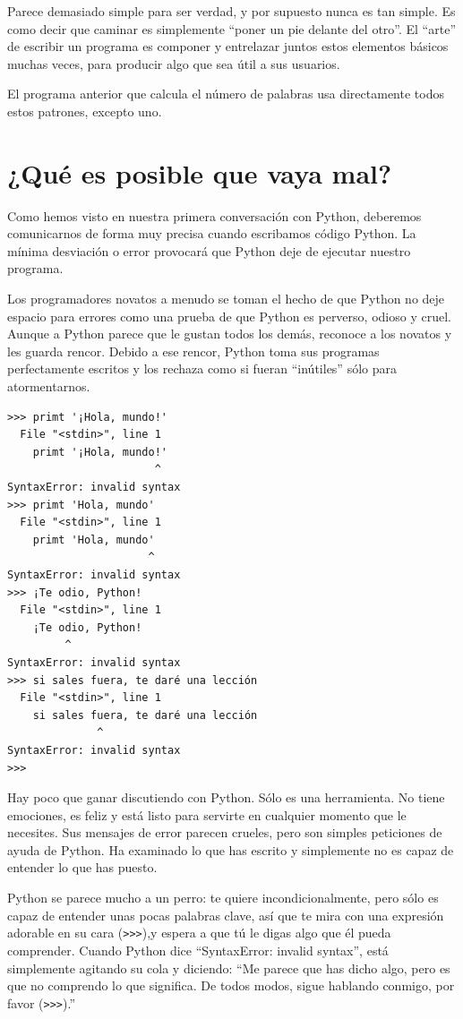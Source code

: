 Parece demasiado simple para ser verdad, y por supuesto nunca es tan simple.
Es como decir que caminar es simplemente
``poner un pie delante del otro''. El ``arte''
de escribir un programa es componer y entrelazar juntos estos
elementos básicos muchas veces, para producir algo
que sea útil a sus usuarios.

El programa anterior que calcula el número de palabras usa directamente
todos estos patrones, excepto uno.

\section{¿Qué es posible que vaya mal?}

Como hemos visto en nuestra primera conversación con Python, deberemos
comunicarnos de forma muy precisa cuando escribamos código Python. La mínima
desviación o error provocará que Python deje de ejecutar
nuestro programa.

Los programadores novatos a menudo se toman el hecho de que Python no
deje espacio para errores como una prueba de que Python es perverso, odioso y cruel.
Aunque a Python parece que le gustan todos los demás, reconoce a los novatos
y les guarda rencor. Debido a ese rencor,
Python toma sus programas perfectamente escritos y los rechaza como si fueran
``inútiles'' sólo para atormentarnos.

\beforeverb
\begin{verbatim}
>>> primt '¡Hola, mundo!'
  File "<stdin>", line 1
    primt '¡Hola, mundo!'
                       ^
SyntaxError: invalid syntax
>>> primt 'Hola, mundo'
  File "<stdin>", line 1
    primt 'Hola, mundo'
                      ^
SyntaxError: invalid syntax
>>> ¡Te odio, Python!
  File "<stdin>", line 1
    ¡Te odio, Python!
         ^
SyntaxError: invalid syntax
>>> si sales fuera, te daré una lección
  File "<stdin>", line 1
    si sales fuera, te daré una lección
              ^
SyntaxError: invalid syntax
>>> 
\end{verbatim}
\afterverb
%
Hay poco que ganar discutiendo con Python. Sólo es una herramienta.
No tiene emociones, es feliz y está listo para servirte en cualquier momento
que le necesites. Sus mensajes de error parecen crueles, pero son simples
peticiones de ayuda de Python. Ha examinado lo que has escrito y simplemente
no es capaz de entender lo que has puesto.

Python se parece mucho a un perro: te quiere incondicionalmente, pero sólo es capaz
de entender unas pocas palabras clave, así que te mira con una expresión
adorable en su cara ({\tt \verb">>>"}),y espera a que tú le digas algo que él pueda comprender.
Cuando Python dice ``SyntaxError: invalid syntax'', está simplemente agitando
su cola y diciendo: ``Me parece que has dicho algo, pero es que no comprendo
lo que significa. De todos modos, sigue hablando conmigo, por favor ({\tt \verb">>>"}).''

